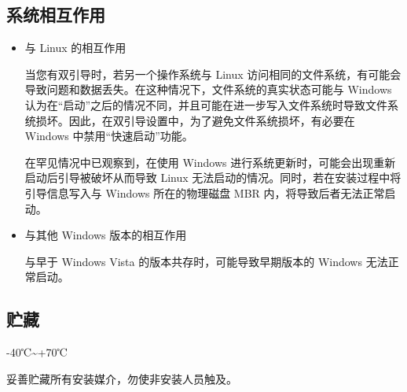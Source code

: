 \documentclass{article}
\begin{document}
\begin{multicols*}{3}





	\begin{tcolorbox}
	\section*{系统相互作用}
	\end{tcolorbox}
	\begin{itemize}[leftmargin=*]
		\setlength{\parindent}{0pt}

		\item 与 Linux 的相互作用

		当您有双引导时，若另一个操作系统与 Linux 访问相同的文件系统，有可能会导致问题和数据丢失。在这种情况下，文件系统的真实状态可能与 Windows 认为在“启动”之后的情况不同，并且可能在进一步写入文件系统时导致文件系统损坏。因此，在双引导设置中，为了避免文件系统损坏，有必要在 Windows 中禁用“快速启动”功能。

		在罕见情况中已观察到，在使用 Windows 进行系统更新时，可能会出现重新启动后引导被破坏从而导致 Linux 无法启动的情况。同时，若在安装过程中将引导信息写入与 Windows 所在的物理磁盘 MBR 内，将导致后者无法正常启动。

		\item 与其他 Windows 版本的相互作用

		与早于 Windows Vista 的版本共存时，可能导致早期版本的 Windows 无法正常启动。

	\end{itemize}


	\begin{tcolorbox}
	\section*{贮藏}
	\end{tcolorbox}

	-40℃\textasciitilde +70℃

	妥善贮藏所有安装媒介，勿使非安装人员触及。

	\medskip



\end{multicols*}
\end{document}
